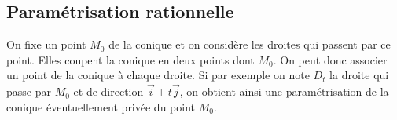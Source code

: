 \subsection{Paramétrisation rationnelle}
On fixe un point $M_0$ de la conique et on considère les droites qui passent par ce point. Elles coupent la conique en deux points dont $M_0$. On peut donc associer un point de la conique à chaque droite. Si par exemple on note $D_t$ la droite qui passe par $M_0$ et de direction $\overrightarrow i + t\overrightarrow j$, on obtient ainsi une paramétrisation de la conique éventuellement privée du point $M_0$.

